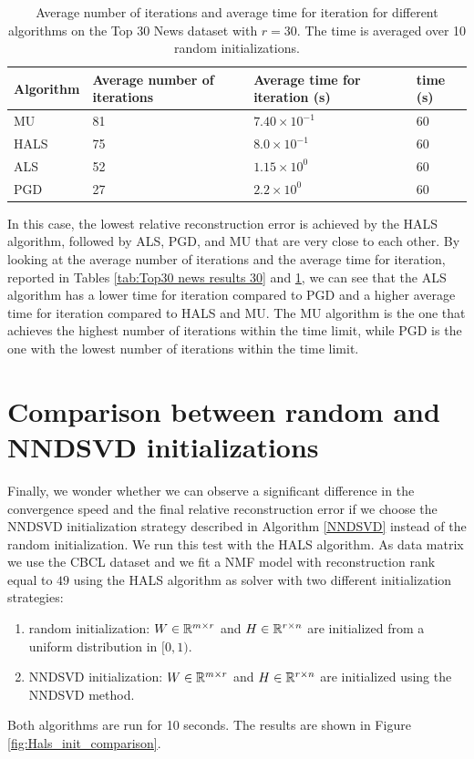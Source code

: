 \begin{table}[htbp]
\begin{tabular}{|l|l|l|l|}
\hline
Algorithm & Average number of iterations & Average time for iteration (s) & time (s) \\ \hline
MU        & 81                          & $7.40 \times 10^{-1}     $                & 60       \\ \hline
HALS      & 75                        & $8.0 \times 10^{-1}     $                & 60       \\ \hline
ALS       & 52                    & $1.15 \times 10^{0}     $                & 60      \\ \hline
PGD       & 27                       & $2.2 \times 10^{0}     $                & 60      \\ \hline
\end{tabular}
\caption{Average number of iterations and average time for iteration for different algorithms on the Top 30 News dataset with $r = 30$. The time is averaged over 10 random initializations.}
\label{tab:Top30 news results 60}
\end{table}

In this case, the lowest relative reconstruction error is achieved by the HALS algorithm, followed by ALS, PGD, and MU that are very close to each other.
By looking at the average number of iterations and the average time for iteration, reported in Tables \ref{tab:Top30 news results 30} and \ref{tab:Top30 news results 60}, we can see that the ALS algorithm has a lower time for iteration compared to PGD and a higher average time for iteration compared to HALS and MU.
The MU algorithm is the one that achieves the highest number of iterations within the time limit, while PGD is the one with the lowest number of iterations within the time limit. 



\section{Comparison between random and NNDSVD initializations}\label{init comparison section}
Finally, we wonder whether we can observe a significant difference in the convergence speed and the final relative reconstruction error if we choose the NNDSVD initialization strategy described in Algorithm \ref{NNDSVD} instead of the random initialization.
We run this test with the HALS algorithm.
As data matrix we use the CBCL dataset and we fit a NMF model with reconstruction rank equal to $49$ using the HALS algorithm as solver with two different initialization strategies:
\begin{enumerate}
    \item random initialization: $W \in \mathbb{R}^{m \times r}$ and $H \in \mathbb{R}^{r \times n}$ are initialized from a uniform distribution in $[0,1)$.
    \item NNDSVD initialization: $W \in \mathbb{R}^{m \times r}$ and $H \in \mathbb{R}^{r \times n}$ are initialized using the NNDSVD method.
\end{enumerate}
Both algorithms are run for 10 seconds. The results are shown in Figure \ref{fig:Hals_init_comparison}.

